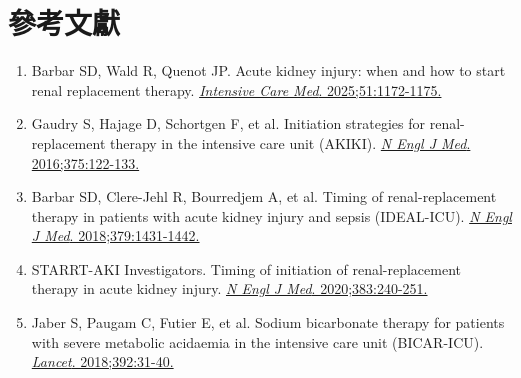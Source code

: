 \documentclass[12pt,a4paper]{article}
\begin{document}
\section{參考文獻}

\begin{enumerate}
    \item Barbar SD, Wald R, Quenot JP. Acute kidney injury: when and how to start renal replacement therapy. \href{https://doi.org/10.1007/s00134-025-07933-x}{\textit{Intensive Care Med}. 2025;51:1172-1175.}

    \item Gaudry S, Hajage D, Schortgen F, et al. Initiation strategies for renal-replacement therapy in the intensive care unit (AKIKI). \href{https://doi.org/10.1056/NEJMoa1603017}{\textit{N Engl J Med}. 2016;375:122-133.}

    \item Barbar SD, Clere-Jehl R, Bourredjem A, et al. Timing of renal-replacement therapy in patients with acute kidney injury and sepsis (IDEAL-ICU). \href{https://doi.org/10.1056/NEJMoa1803213}{\textit{N Engl J Med}. 2018;379:1431-1442.}

    \item STARRT-AKI Investigators. Timing of initiation of renal-replacement therapy in acute kidney injury. \href{https://doi.org/10.1056/NEJMoa1914579}{\textit{N Engl J Med}. 2020;383:240-251.}

    \item Jaber S, Paugam C, Futier E, et al. Sodium bicarbonate therapy for patients with severe metabolic acidaemia in the intensive care unit (BICAR-ICU). \href{https://doi.org/10.1016/S0140-6736(18)31080-8}{\textit{Lancet}. 2018;392:31-40.}
\end{enumerate}
\end{document}
